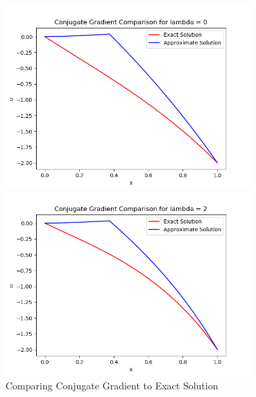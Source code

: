 \documentclass{article}
\begin{document}
\begin{figure}[H]
\centering
\caption{Comparing Conjugate Gradient to Exact Solution}
\begin{minipage}[b]{0.4\textwidth}
\includegraphics[height=7cm]{cg0}	
\end{minipage}
\hspace{0.6in}
\begin{minipage}[b]{0.4\textwidth}
\centering
\includegraphics[height=7cm]{cg2}	
\end{minipage}
\end{figure}
\end{document}
